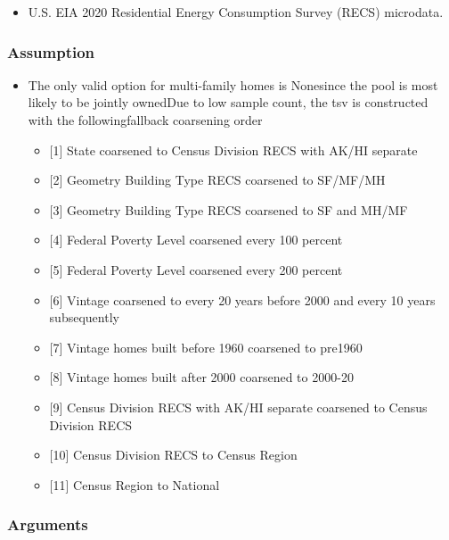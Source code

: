 \begin{itemize}
 
\item
  U.S. EIA 2020 Residential Energy Consumption Survey (RECS) microdata.
\end{itemize}

\subsubsection{Assumption}\label{assumption-71}

\begin{itemize}
 
\item
  The only valid option for multi-family homes is Nonesince the pool is
  most likely to be jointly ownedDue to low sample count, the tsv is
  constructed with the followingfallback coarsening order

  \begin{itemize}
   
  \item
    {[}1{]} State coarsened to Census Division RECS with AK/HI separate
  \item
    {[}2{]} Geometry Building Type RECS coarsened to SF/MF/MH
  \item
    {[}3{]} Geometry Building Type RECS coarsened to SF and MH/MF
  \item
    {[}4{]} Federal Poverty Level coarsened every 100 percent
  \item
    {[}5{]} Federal Poverty Level coarsened every 200 percent
  \item
    {[}6{]} Vintage coarsened to every 20 years before 2000 and every 10
    years subsequently
  \item
    {[}7{]} Vintage homes built before 1960 coarsened to pre1960
  \item
    {[}8{]} Vintage homes built after 2000 coarsened to 2000-20
  \item
    {[}9{]} Census Division RECS with AK/HI separate coarsened to Census
    Division RECS
  \item
    {[}10{]} Census Division RECS to Census Region
  \item
    {[}11{]} Census Region to National
  \end{itemize}
\end{itemize}

\subsubsection{Arguments}\label{arguments-80}

